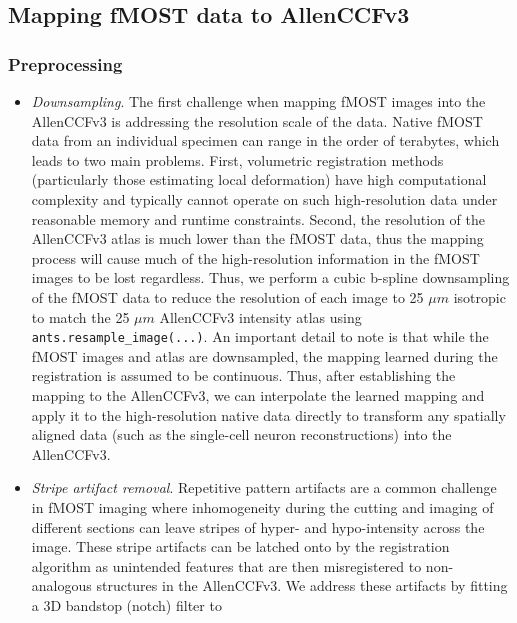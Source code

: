 \documentclass[
  12pt,
]{article}
\begin{document}
\hypertarget{mapping-fmost-data-to-allenccfv3}{%
\subsection{Mapping fMOST data to
AllenCCFv3}\label{mapping-fmost-data-to-allenccfv3}}

\hypertarget{preprocessing}{%
\subsubsection{Preprocessing}\label{preprocessing}}

\begin{itemize}
\item
  \emph{Downsampling}. The first challenge when mapping fMOST images
  into the AllenCCFv3 is addressing the resolution scale of the data.
  Native fMOST data from an individual specimen can range in the order
  of terabytes, which leads to two main problems. First, volumetric
  registration methods (particularly those estimating local deformation)
  have high computational complexity and typically cannot operate on
  such high-resolution data under reasonable memory and runtime
  constraints. Second, the resolution of the AllenCCFv3 atlas is much
  lower than the fMOST data, thus the mapping process will cause much of
  the high-resolution information in the fMOST images to be lost
  regardless. Thus, we perform a cubic b-spline downsampling of the
  fMOST data to reduce the resolution of each image to 25 \(\mu m\)
  isotropic to match the 25 \(\mu m\) AllenCCFv3 intensity atlas using
  \texttt{ants.resample\_image(...)}. An important detail to note is
  that while the fMOST images and atlas are downsampled, the mapping
  learned during the registration is assumed to be continuous. Thus,
  after establishing the mapping to the AllenCCFv3, we can interpolate
  the learned mapping and apply it to the high-resolution native data
  directly to transform any spatially aligned data (such as the
  single-cell neuron reconstructions) into the AllenCCFv3.
\item
  \emph{Stripe artifact removal}. Repetitive pattern artifacts are a
  common challenge in fMOST imaging where inhomogeneity during the
  cutting and imaging of different sections can leave stripes of hyper-
  and hypo-intensity across the image. These stripe artifacts can be
  latched onto by the registration algorithm as unintended features that
  are then misregistered to non-analogous structures in the AllenCCFv3.
  We address these artifacts by fitting a 3D bandstop (notch) filter to

\end{itemize}
\end{document}
